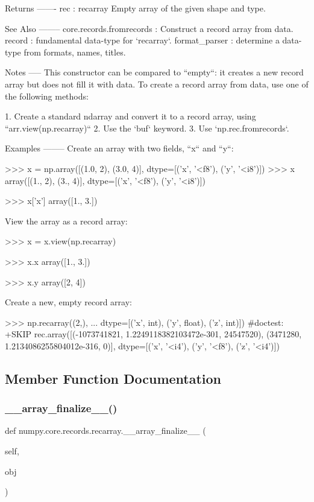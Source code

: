 \begin{DoxyVerb}
Returns
-------
rec : recarray
    Empty array of the given shape and type.

See Also
--------
core.records.fromrecords : Construct a record array from data.
record : fundamental data-type for `recarray`.
format_parser : determine a data-type from formats, names, titles.

Notes
-----
This constructor can be compared to ``empty``: it creates a new record
array but does not fill it with data.  To create a record array from data,
use one of the following methods:

1. Create a standard ndarray and convert it to a record array,
   using ``arr.view(np.recarray)``
2. Use the `buf` keyword.
3. Use `np.rec.fromrecords`.

Examples
--------
Create an array with two fields, ``x`` and ``y``:

>>> x = np.array([(1.0, 2), (3.0, 4)], dtype=[('x', '<f8'), ('y', '<i8')])
>>> x
array([(1., 2), (3., 4)], dtype=[('x', '<f8'), ('y', '<i8')])

>>> x['x']
array([1., 3.])

View the array as a record array:

>>> x = x.view(np.recarray)

>>> x.x
array([1., 3.])

>>> x.y
array([2, 4])

Create a new, empty record array:

>>> np.recarray((2,),
... dtype=[('x', int), ('y', float), ('z', int)]) #doctest: +SKIP
rec.array([(-1073741821, 1.2249118382103472e-301, 24547520),
       (3471280, 1.2134086255804012e-316, 0)],
      dtype=[('x', '<i4'), ('y', '<f8'), ('z', '<i4')])\end{DoxyVerb}
 

\subsection{Member Function Documentation}
\mbox{\label{classnumpy_1_1core_1_1records_1_1recarray_a0f0d7c04057cd35a49b9904c79948b5e}} 
\subsubsection{\texorpdfstring{\+\_\+\+\_\+array\+\_\+finalize\+\_\+\+\_\+()}{\_\_array\_finalize\_\_()}}
{\footnotesize\ttfamily def numpy.\+core.\+records.\+recarray.\+\_\+\+\_\+array\+\_\+finalize\+\_\+\+\_\+ (\begin{DoxyParamCaption}\item[{}]{self,  }\item[{}]{obj }\end{DoxyParamCaption})}

